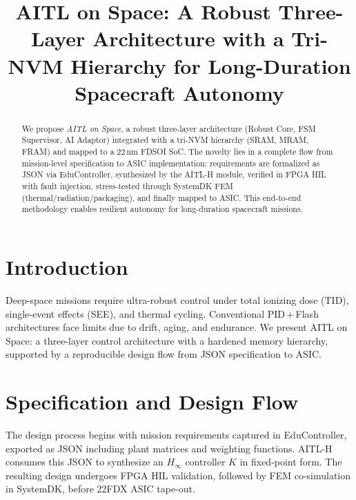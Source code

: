 \documentclass[conference]{IEEEtran}
\title{AITL on Space: A Robust Three-Layer Architecture with a Tri-NVM Hierarchy for Long-Duration Spacecraft Autonomy}
\author{
\IEEEauthorblockN{Shinichi Samizo}
\IEEEauthorblockA{Independent Semiconductor Researcher\\
Former Engineer at Seiko Epson Corporation\\
Email: shin3t72@gmail.com\quad GitHub: \url{https://github.com/Samizo-AITL}}
}
\begin{document}
\maketitle

\begin{abstract}
We propose \emph{AITL on Space}, a robust three-layer architecture (Robust Core, FSM Supervisor, AI Adaptor) integrated with a tri-NVM hierarchy (SRAM, MRAM, FRAM) and mapped to a 22\,nm FD\!SOI SoC. The novelty lies in a complete flow from mission-level specification to ASIC implementation: requirements are formalized as JSON via EduController, synthesized by the AITL-H module, verified in FPGA HIL with fault injection, stress-tested through SystemDK FEM (thermal/radiation/packaging), and finally mapped to ASIC. This end-to-end methodology enables resilient autonomy for long-duration spacecraft missions.
\end{abstract}

\section{Introduction}
Deep-space missions require ultra-robust control under total ionizing dose (TID), single-event effects (SEE), and thermal cycling. Conventional PID\,+\,Flash architectures face limits due to drift, aging, and endurance. We present AITL on Space: a three-layer control architecture with a hardened memory hierarchy, supported by a reproducible design flow from JSON specification to ASIC.

\section{Specification and Design Flow}
The design process begins with mission requirements captured in EduController, exported as JSON including plant matrices and weighting functions. AITL-H consumes this JSON to synthesize an $H_\infty$ controller $K$ in fixed-point form. The resulting design undergoes FPGA HIL validation, followed by FEM co-simulation in SystemDK, before 22FDX ASIC tape-out.
\end{document}
